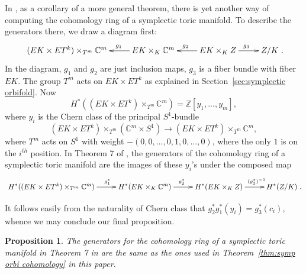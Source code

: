 \documentclass[12pt]{amsart}
\newtheorem{proposition}[theorem]{Proposition}
\theoremstyle{definition}
\numberwithin{equation}{section}
\begin{document}
In \cite{TW:quotients}, as a corollary of a more general theorem,
there is yet another way of computing the cohomology ring of a
symplectic toric manifold. To describe the generators there, we draw
a diagram first:
\begin{equation}
\xymatrix{
  (EK\times ET^k)\times_{T^m}{{\mathbb{C}}}^m & EK\times_{K}{{\mathbb{C}}}^m \ar[l]_(0.4){g_{1}} & EK\times_{K}Z \ar[l]_{g_{2}} \ar[r]^(0.55){g_{3}}& Z/K
  }.
\end{equation}
In the diagram, $g_{1}$ and $g_{2}$ are just inclusion maps, $g_{3}$
is a fiber bundle with fiber $EK$. The group $T^m$ acts on $EK\times
ET^k$ as explained in Section~\ref{sec:symplectic orbifold}. Now
\begin{equation}H^{*}((EK\times ET^k)\times_{T^m}{{\mathbb{C}}}^m) =
{{\mathbb{Z}}}[y_{1},...,y_{m}],\end{equation} where $y_{i}$ is the Chern class
of the principal $S^1$-bundle
\begin{equation}
(EK\times ET^k)\times_{T^m}({{\mathbb{C}}}^m\times S^1)\rightarrow (EK\times
ET^k)\times_{T^m}{{\mathbb{C}}}^m,
\end{equation}
where $T^m$ acts on $S^1$ with weight $-(0,0,...,0,1,0,...,0)$,
where the only $1$ is on the $i^{th}$ position. In Theorem 7 of
\cite{TW:quotients}, the generators of the cohomology ring of a
symplectic toric manifold are the images of these $y_{i}$'s under
the composed map
\begin{equation}\small
\xymatrix{ H^{*}((EK\times ET^k)\times_{T^m}{{\mathbb{C}}}^m)
\ar[r]^(0.6){g_{1}^{*}} & H^{*}(EK\times_{K}{{\mathbb{C}}}^m) \ar[r]^{g_{2}^{*}}
& H^{*}(EK\times_{K}Z) \ar[r]^(0.6){(g_{3}^{*})^{-1}} & H^{*}(Z/K)
}.
\end{equation}

It follows easily from the naturality of Chern class that
$g_{2}^{*}g_{1}^{*}(y_{i})=g_{3}^{*}(c_{i})$, whence we may conclude
our final proposition.

\begin{proposition}
The generators for the cohomology ring of a symplectic toric
manifold in Theorem 7 in \cite{TW:quotients} are the same as the
ones used in Theorem~\ref{thm:symp orbi cohomology} in this paper.
\end{proposition}
\end{document}
